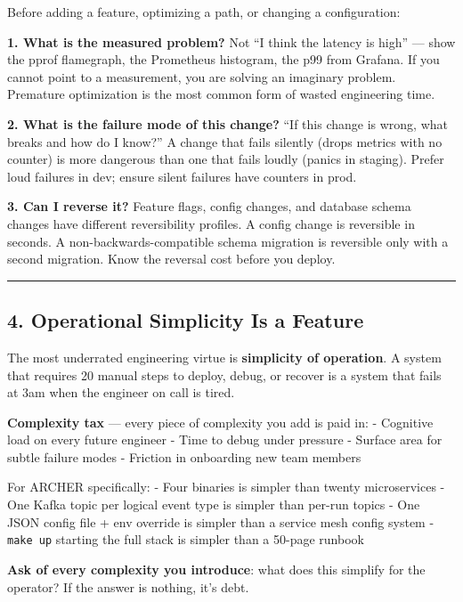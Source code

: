 \documentclass[
]{article}
\begin{document}
Before adding a feature, optimizing a path, or changing a configuration:

\textbf{1. What is the measured problem?} Not ``I think the latency is
high'' --- show the pprof flamegraph, the Prometheus histogram, the p99
from Grafana. If you cannot point to a measurement, you are solving an
imaginary problem. Premature optimization is the most common form of
wasted engineering time.

\textbf{2. What is the failure mode of this change?} ``If this change is
wrong, what breaks and how do I know?'' A change that fails silently
(drops metrics with no counter) is more dangerous than one that fails
loudly (panics in staging). Prefer loud failures in dev; ensure silent
failures have counters in prod.

\textbf{3. Can I reverse it?} Feature flags, config changes, and
database schema changes have different reversibility profiles. A config
change is reversible in seconds. A non-backwards-compatible schema
migration is reversible only with a second migration. Know the reversal
cost before you deploy.

\begin{center}\rule{0.5\linewidth}{0.5pt}\end{center}

\hypertarget{operational-simplicity-is-a-feature}{%
\subsection{4. Operational Simplicity Is a
Feature}\label{operational-simplicity-is-a-feature}}

The most underrated engineering virtue is \textbf{simplicity of
operation}. A system that requires 20 manual steps to deploy, debug, or
recover is a system that fails at 3am when the engineer on call is
tired.

\textbf{Complexity tax} --- every piece of complexity you add is paid
in: - Cognitive load on every future engineer - Time to debug under
pressure - Surface area for subtle failure modes - Friction in
onboarding new team members

For ARCHER specifically: - Four binaries is simpler than twenty
microservices - One Kafka topic per logical event type is simpler than
per-run topics - One JSON config file + env override is simpler than a
service mesh config system - \texttt{make\ up} starting the full stack
is simpler than a 50-page runbook

\textbf{Ask of every complexity you introduce}: what does this simplify
for the operator? If the answer is nothing, it's debt.
\end{document}
